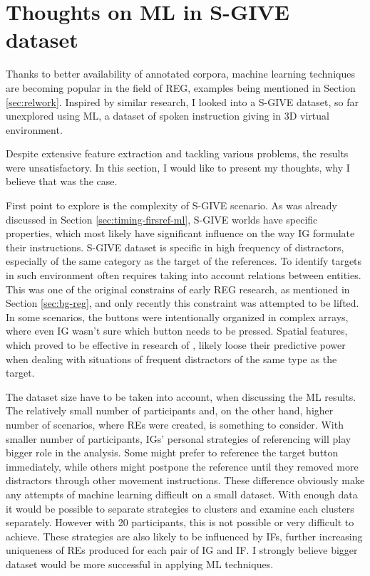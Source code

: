 \section{Thoughts on ML in S-GIVE dataset}
Thanks to better availability of annotated corpora, machine learning techniques are becoming popular in the field of REG, examples being mentioned in Section \ref{sec:relwork}. Inspired by similar research, I looked into a S-GIVE dataset, so far unexplored using ML, a dataset of spoken instruction giving in 3D virtual environment.

Despite extensive feature extraction and tackling various problems, the results were unsatisfactory. In this section, I would like to present my thoughts, why I believe that was the case.

First point to explore is the complexity of S-GIVE scenario. As was already discussed in Section \ref{sec:timing-firsref-ml}, S-GIVE worlds have specific properties, which most likely have significant influence on the way IG formulate their instructions. S-GIVE dataset is specific in high frequency of distractors, especially of the same category as the target of the references. To identify targets in such environment often requires taking into account relations between entities. This was one of the original constrains of early REG research, as mentioned in Section \ref{sec:bg-reg}, and only recently this constraint was attempted to be lifted. In some scenarios, the buttons were intentionally organized in complex arrays, where even IG wasn't sure which button needs to be pressed. Spatial features, which proved to be effective in research of \citet{stoia2006sentence}, likely loose their predictive power when dealing with situations of frequent distractors of the same type as the target.

The dataset size have to be taken into account, when discussing the ML results. The relatively small number of participants and, on the other hand, higher number of scenarios, where REs were created, is something to consider. With smaller number of participants, IGs' personal strategies of referencing will play bigger role in the analysis. Some might prefer to reference the target button immediately, while others might postpone the reference until they removed more distractors through other movement instructions. These difference obviously make any attempts of machine learning difficult on a small dataset. With enough data it would be possible to separate strategies to clusters and examine each clusters separately. However with 20 participants, this is not possible or very difficult to achieve. These strategies are also likely to be influenced by IFs, further increasing uniqueness of REs produced for each pair of IG and IF. I strongly believe bigger dataset would be more successful in applying ML techniques.

